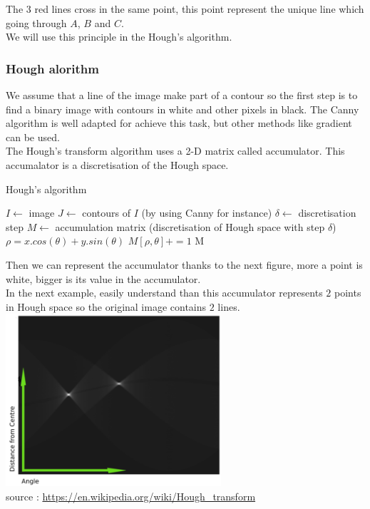 \documentclass{article}
\begin{document}
The 3 red lines cross in the same point, this point represent the unique line which going through $A$, $B$ and $C$.\\
We will use this principle in the Hough's algorithm.

\subsubsection{Hough alorithm}

We assume that a line of the image make part of a contour so the first step is to find a binary image with contours in white and other pixels in black. The Canny algorithm is well adapted for achieve this task, but other methods like gradient can be used.\\

The Hough's transform algorithm uses a 2-D matrix called accumulator. This accumalator is a discretisation of the Hough space.

\begin{algorithm}
\caption{Hough's algorithm}
\begin{algorithmic} 
\STATE $I \leftarrow $ image
\STATE $J \leftarrow $ contours of $I$ (by using Canny for instance)
\STATE $\delta \leftarrow $ discretisation step
\STATE $M \leftarrow $ accumulation matrix (discretisation of Hough space with step $\delta$)
\STATE $\rho = x.cos(\theta) + y.sin(\theta)$
\STATE $M[\rho, \theta] += 1$
\ENDFOR
\ENDFOR
\RETURN M
\end{algorithmic}
\end{algorithm}

Then we can represent the accumulator thanks to the next figure, more a point is white, bigger is its value in the accumulator.\\

In the next example, easily understand than this accumulator represents $2$ points in Hough space so the original image contains $2$ lines.\\

\includegraphics[width=8cm]{images/img20.png}\\
source : \url{https://en.wikipedia.org/wiki/Hough_transform} \\
\end{document}

